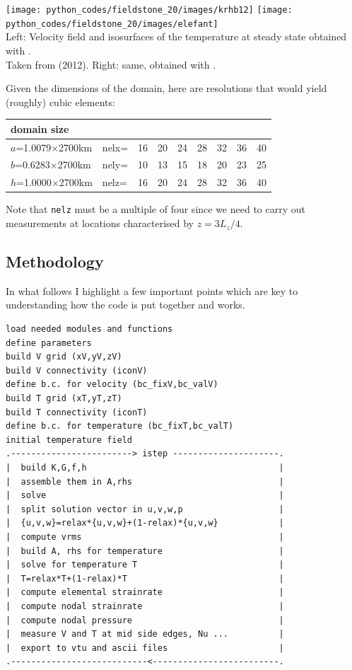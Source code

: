 \begin{center}
\texttt{[image: python\_codes/fieldstone\_20/images/krhb12]}
\texttt{[image: python\_codes/fieldstone\_20/images/elefant]}\\
{\captionfont Left: 
Velocity field and isosurfaces of the temperature at steady state obtained 
with \aspect.\\ Taken from \textcite{krhb12} (2012).
Right: same, obtained with \elefant \cite{thie14}.}
\end{center}


\noindent Given the dimensions of the domain, here are resolutions that would yield (roughly) cubic elements:
\begin{center}
\begin{tabular}{l|lccccccc|}
domain size & \\
\hline
$a$=1.0079$\times$2700km & nelx= &16 &20 &24 &28 &32 &36 &40 \\  
$b$=0.6283$\times$2700km & nely= &10 &13 &15 &18 &20 &23 &25 \\
$h$=1.0000$\times$2700km & nelz= &16 &20 &24 &28 &32 &36 &40 \\  
\hline
\end{tabular}
\end{center}
Note that \lstinline{nelz} must be a multiple of four since we need to carry out measurements at 
locations characterised by $z=3L_z/4$.

\subsection*{Methodology}

In what follows I highlight a few important points which are key to understanding how the code
is put together and works. 

\begin{verbatim}
load needed modules and functions
define parameters
build V grid (xV,yV,zV)
build V connectivity (iconV)
define b.c. for velocity (bc_fixV,bc_valV)
build T grid (xT,yT,zT)
build T connectivity (iconT)
define b.c. for temperature (bc_fixT,bc_valT)
initial temperature field
.------------------------> istep ---------------------.
|  build K,G,f,h                                      |
|  assemble them in A,rhs                             |
|  solve                                              |
|  split solution vector in u,v,w,p                   |
|  {u,v,w}=relax*{u,v,w}+(1-relax)*{u,v,w}            |
|  compute vrms                                       |
|  build A, rhs for temperature                       |
|  solve for temperature T                            |
|  T=relax*T+(1-relax)*T                              |
|  compute elemental strainrate                       |
|  compute nodal strainrate                           |
|  compute nodal pressure                             |
|  measure V and T at mid side edges, Nu ...          |
|  export to vtu and ascii files                      | 
.---------------------------<-------------------------.
\end{verbatim}

